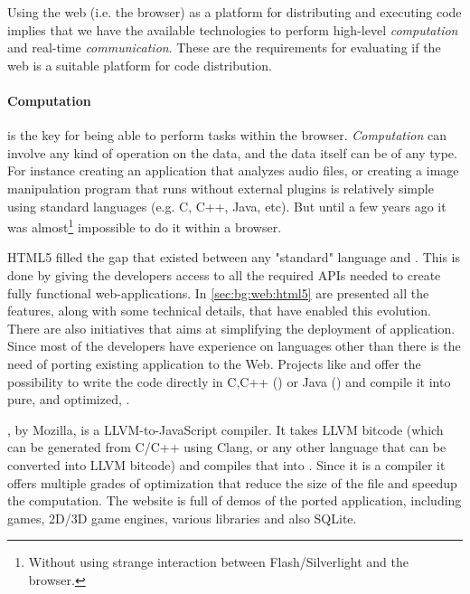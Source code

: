 
Using the web (i.e. the browser) as a platform for distributing and executing
code implies that we have the available technologies to perform high-level
\emph{computation} and real-time \emph{communication}. These are the requirements
for evaluating if the web is a suitable platform for code distribution.

\paragraph{Computation} is the key for being able to perform tasks within the
browser. \emph{Computation} can involve any kind of operation on the data, and
the data itself can be of any type. For instance creating an application that
analyzes audio files, or creating a image manipulation program that runs without
external plugins is relatively simple using standard languages (e.g. C, C++,
Java, etc). But until a few years ago it was almost\footnote{Without using strange
interaction between Flash/Silverlight and the browser.} impossible to do it within
a browser.

HTML5 filled the gap that existed between any "standard" language and \js{}.
This is done by giving the developers access to all the required APIs needed to
create fully functional web-applications. In \ref{sec:bg:web:html5} are presented
all the features, along with some technical details, that have enabled this evolution.\\

There are also initiatives that aims at simplifying the deployment of \js{}
application. Since most of the developers have experience on languages other than
\js{} there is the need of porting existing application to the Web.
Projects like  and 
offer the possibility to write the code directly in C,C++ ()
or Java () and compile it into pure, and optimized, \js{}.

, by Mozilla, is a LLVM-to-JavaScript compiler. It takes
LLVM bitcode (which can be generated from C/C++ using Clang, or any other
language that can be converted into LLVM bitcode) and compiles that into \js{}.
Since it is a compiler it offers multiple grades of optimization that reduce the
size of the \js{} file and speedup the computation. The website is full of demos
of the ported application, including games, 2D/3D game engines, various libraries
and also SQLite.

